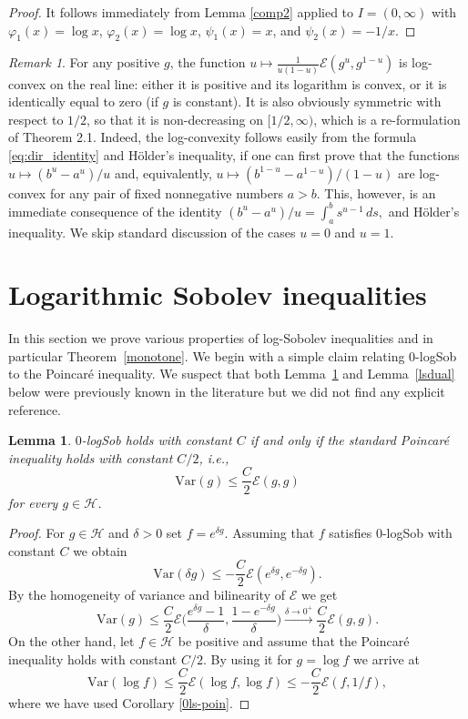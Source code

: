 \documentclass[11pt]{amsart}
\newcommand{\Var}{\mathrm{Var}}
\newcommand{\1}{\mathbf{1}}
\def\e{{\mathcal{E}}}
\def\H{{\mathcal{H}}}
\theoremstyle{definition}
\theoremstyle{plain}
\newtheorem{lemma}[example]{Lemma}
\theoremstyle{remark}
\newtheorem{remark}[example]{Remark}
\numberwithin{equation}{section}
\begin{document}
\begin{proof}
It follows immediately from Lemma \ref{comp2} applied to
$I=(0,\infty)$ with $\varphi_{1}(x)=\log x$, $\varphi_{2}(x)=\log x$, $\psi_{1}(x)=x$, and $\psi_{2}(x)=-1/x$.
\end{proof}

\begin{remark}
For any positive $g$, the function $u \mapsto \frac{1}{u(1-u)}\e(g^{u},g^{1-u})$ is log-convex on the real line:
either it is positive and its logarithm is convex, or it is identically equal to zero (if $g$ is constant).
It is also obviously symmetric with respect to $1/2$, so that it is non-decreasing on $[1/2, \infty)$, which is a re-formulation of Theorem 2.1. Indeed, the log-convexity follows easily from the formula \eqref{eq:dir_identity} and H\"older's inequality, if one can first prove that the functions $u \mapsto (b^{u}-a^{u})/u$ and, equivalently, $u \mapsto (b^{1-u}-a^{1-u})/(1-u)$ are log-convex for any pair of fixed nonnegative numbers $a>b$. This, however, is an immediate consequence of the identity 
$
(b^{u}-a^{u})/u=\int_{a}^{b} s^{u-1}\,ds,
$
and H\"older's inequality. We skip standard discussion of the cases $u=0$ and $u=1$.
\end{remark}


\section{Logarithmic Sobolev inequalities}

In this section we prove various properties of log-Sobolev inequalities and in particular Theorem~\ref{monotone}.
We begin with a simple claim relating $0$-logSob to the Poincar\'e inequality. We suspect  that both Lemma~\ref{0ls=poin} and Lemma~\ref{lsdual} below were previously known in the literature but we did not find any explicit reference. 

\begin{lemma} \label{0ls=poin}
$0$-logSob holds with constant $C$ if and only if the standard Poincar\'e inequality holds with constant $C/2$, i.e.,
\[
\Var(g) \leq \frac{C}{2} \e(g,g)
\]
for every $g \in \H$.
\end{lemma}

\begin{proof}
For $g \in \H$ and $\delta>0$ set $f=e^{\delta g}$. Assuming that $f$ satisfies $0$-logSob with constant $C$ we obtain
\[
\Var(\delta g) \leq -\frac{C}{2}\e(e^{\delta g}, e^{-\delta g}).
\]
By the homogeneity of variance and bilinearity of $\e$ we get
\[
\Var(g) \leq \frac{C}{2}\e \Big(\frac{e^{\delta g}-1}{\delta}, \frac{1-e^{-\delta g}}{\delta} \Big) \stackrel{\delta \to 0^{+}}{\longrightarrow} \frac{C}{2}\e(g,g).
\]
On the other hand, let $f \in \H$ be positive and assume that the Poincar\'e inequality holds with constant $C/2$.
By using it for $g=\log f$ we arrive at
\[
\Var(\log f) \leq \frac{C}{2}\e(\log f, \log f) \leq
-\frac{C}{2}\e(f,1/f),
\]
where we have used Corollary \ref{0ls-poin}.
\end{proof}
\end{document}
